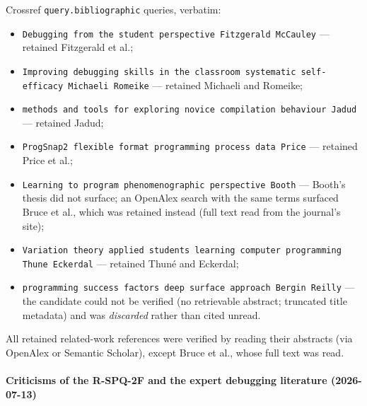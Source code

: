 Crossref \texttt{query.bibliographic} queries, verbatim:
\begin{itemize}
  \item \texttt{Debugging from the student perspective Fitzgerald
    McCauley} --- retained Fitzgerald et al.;
  \item \texttt{Improving debugging skills in the classroom systematic
    self-efficacy Michaeli Romeike} --- retained Michaeli and Romeike;
  \item \texttt{methods and tools for exploring novice compilation
    behaviour Jadud} --- retained Jadud;
  \item \texttt{ProgSnap2 flexible format programming process data Price}
    --- retained Price et al.;
  \item \texttt{Learning to program phenomenographic perspective Booth}
    --- Booth's thesis did not surface; an OpenAlex search with the same
    terms surfaced Bruce et al., which was retained instead (full text
    read from the journal's site);
  \item \texttt{Variation theory applied students learning computer
    programming Thune Eckerdal} --- retained Thuné and Eckerdal;
  \item \texttt{programming success factors deep surface approach Bergin
    Reilly} --- the candidate could not be verified (no retrievable
    abstract; truncated title metadata) and was \emph{discarded} rather
    than cited unread.
\end{itemize}
All retained related-work references were verified by reading their
abstracts (via OpenAlex or Semantic Scholar), except Bruce et al., whose
full text was read.

\paragraph{Criticisms of the R-SPQ-2F and the expert debugging literature
(2026-07-13)}

